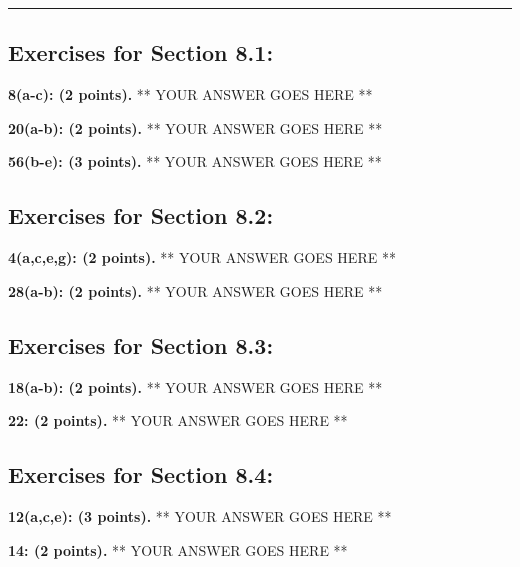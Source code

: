 \documentclass[12pt]{article}  %
\begin{document}
\rule{6in}{.1pt}       %


\subsection*{Exercises for Section 8.1:}     

\noindent
{\bf 8(a-c): (2 points).}
** YOUR ANSWER GOES HERE **

\noindent
{\bf 20(a-b): (2 points).}
** YOUR ANSWER GOES HERE **

\noindent
{\bf 56(b-e): (3 points).}
** YOUR ANSWER GOES HERE **

\subsection*{Exercises for Section 8.2:}     
\noindent
{\bf 4(a,c,e,g): (2 points).}
** YOUR ANSWER GOES HERE **

\noindent
{\bf 28(a-b): (2 points).}
** YOUR ANSWER GOES HERE **

\subsection*{Exercises for Section 8.3:}     
\noindent
{\bf 18(a-b): (2 points).}
** YOUR ANSWER GOES HERE **

\noindent
{\bf 22: (2 points).}
** YOUR ANSWER GOES HERE **

\subsection*{Exercises for Section 8.4:}     
\noindent
{\bf 12(a,c,e): (3 points).}
** YOUR ANSWER GOES HERE **

\noindent
{\bf 14: (2 points).}
** YOUR ANSWER GOES HERE **
\end{document}

